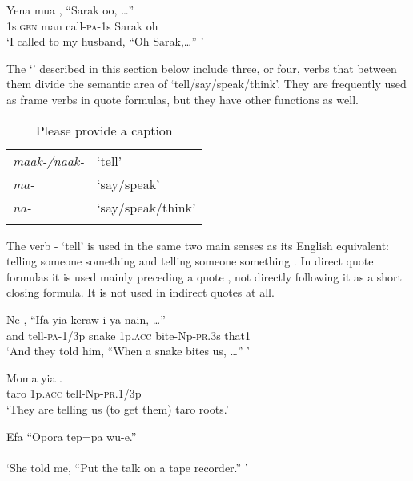 \ea%
\label{ex:3:x311}
\gll Yena mua , ``Sarak oo, {\dots}'' \\
1s.\textsc{gen} man call-\textsc{pa}-1s Sarak oh \\
\glt`I called to my husband, ``Oh Sarak,{\dots}'' '
\z

The `' described in this section below include three, or four, verbs that between them divide the semantic area of `tell/say/speak/think'. They are frequently used as frame verbs in quote formulas, but they have other functions as well.

\begin{table}
\caption{Please provide a caption}
\label{} 
\begin{tabular}{>{\itshape}ll}
\mytoprule
maak-/naak- &`tell'\\
ma- &`say/speak'\\
na- &`say/speak/think'\\
\mybottomrule
\end{tabular}

\end{table}

The verb - `tell' is used in the same two main senses as its English equivalent: telling someone  something  and telling someone  something . In direct quote formulas it is used mainly preceding a quote , not directly following it as a short closing formula. It is not used in indirect quotes at all.

\ea%
\label{ex:3:x312}
\gll Ne , ``Ifa yia keraw-i-ya nain, {\dots''} \\
and tell-\textsc{pa}-1/3p snake 1p.\textsc{acc} bite-Np-\textsc{pr}.3s that1\\
\glt`And they told him, ``When a snake bites us, {\dots}'' '
\z

\ea%
\label{ex:3:x313}
\gll Moma yia . \\
taro 1p.\textsc{acc} tell-Np-\textsc{pr}.1/3p \\
\glt`They are telling us (to get them) taro roots.'
\z

\ea%
\label{ex:3:x314}
\gll Efa\textstyleFreeTranslationChar{ } \textstyleFreeTranslationChar{, } ``Opora tep=pa wu-e.'' \\
\\
\glt`She told me, ``Put the talk on a tape recorder.'' '
\z

